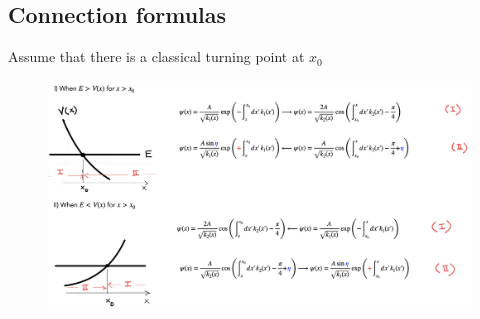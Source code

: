 \subsection{Connection formulas}
Assume that there is a classical turning point at $x_0$
\begin{center}\begin{figure}
\includegraphics[width=1\linewidth]{src/WKB connection.png}
\end{figure}\end{center}

